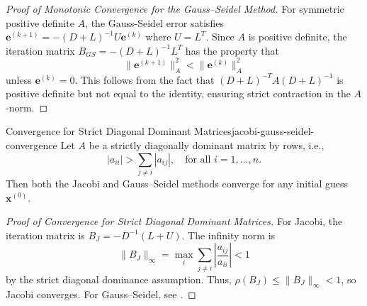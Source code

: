 \begin{proof}[Proof of Monotonic Convergence for the Gauss--Seidel Method]
    For symmetric positive definite $A$, the Gauss-Seidel error satisfies $\mathbf{e}^{(k+1)} = -(D + L)^{-1}U \mathbf{e}^{(k)}$ where $U = L^T$. Since $A$ is positive definite, the iteration matrix $B_{GS} = -(D + L)^{-1}L^T$ has the property that
    \[
    \|\mathbf{e}^{(k+1)}\|_A^2 < \|\mathbf{e}^{(k)}\|_A^2
    \]
    unless $\mathbf{e}^{(k)} = 0$. This follows from the fact that $(D + L)^{-T} A (D + L)^{-1}$ is positive definite but not equal to the identity, ensuring strict contraction in the $A$-norm.
\end{proof}
\begin{theorem}{Convergence for Strict Diagonal Dominant Matrices}{jacobi-gauss-seidel-convergence}
    Let $A$ be a strictly diagonally dominant matrix by rows, i.e.,
    \[
        |a_{ii}| > \sum_{j \neq i} |a_{ij}|, \quad \text{for all } i = 1, \ldots, n.
    \]
    Then both the Jacobi and Gauss--Seidel methods converge for any initial guess $\mathbf{x}^{(0)}$.
\end{theorem}

\begin{proof}[Proof of Convergence for Strict Diagonal Dominant Matrices]
    For Jacobi, the iteration matrix is $B_J = -D^{-1}(L+U)$. The infinity norm is
    \[
        \|B_J\|_\infty = \max_{i} \sum_{j \neq i} \left|\frac{a_{ij}}{a_{ii}}\right| < 1
    \]
    by the strict diagonal dominance assumption. Thus, $\rho(B_J) \leq \|B_J\|_\infty < 1$, so Jacobi converges.
    For Gauss--Seidel, see \cite{Axe94}.
\end{proof}

